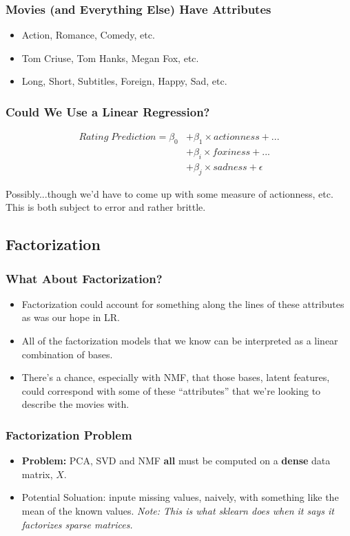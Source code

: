 \documentclass{beamer}
\begin{document}
\begin{frame}
  \frametitle{Movies (and Everything Else) Have Attributes}
  \begin{itemize}
    \item Action, Romance, Comedy, etc.
    \item Tom Criuse, Tom Hanks, Megan Fox, etc.
    \item Long, Short, Subtitles, Foreign, Happy, Sad, etc.
  \end{itemize}
\end{frame}

\begin{frame}
  \frametitle{Could We Use a Linear Regression?}
  \begin{align*}
    Rating\; Prediction = \beta_0 &+ \beta_1 \times actionness + ... \\
    &+ \beta_i \times foxiness + ... \\
    &+ \beta_j \times sadness + \epsilon
  \end{align*} \vspace{4mm} \pause

  Possibly...though we'd have to come up with some measure of actionness, etc. This is both subject to error and rather brittle.
\end{frame}

\subsection{Factorization}
\begin{frame}
  \frametitle{What About Factorization?}
  \begin{itemize}
    \item Factorization could account for something along the lines of these attributes as was our hope in LR. \vspace{2mm}
    \item All of the factorization models that we know can be interpreted as a linear combination of bases. \vspace{2mm}
    \item There's a chance, especially with NMF, that those bases, latent features, could correspond with some of these ``attributes'' that we're looking to describe the movies with.
  \end{itemize}
\end{frame}

\begin{frame}
  \frametitle{Factorization Problem}
  \begin{itemize}
    \item \textbf{Problem:} PCA, SVD and NMF \textbf{all} must be computed on a \textbf{dense} data matrix, $X$. \vspace{2mm}
    \item Potential Soluation: inpute missing values, naively, with something like the mean of the known values. \textit{Note: This is what sklearn does when it says it factorizes sparse matrices.}
  \end{itemize}
\end{frame}
\end{document}
